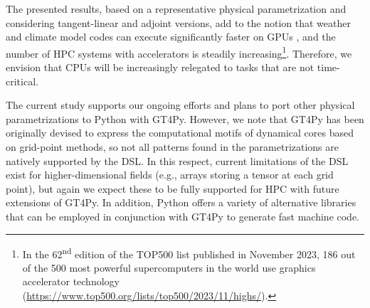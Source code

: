 \documentclass[gmd,manuscript,online]{copernicus}
\theoremstyle{theorem}
\theoremstyle{definition}
\theoremstyle{remark}
\theoremstyle{proposition}
\begin{document}
	The presented results, based on a representative physical parametrization and considering tangent-linear and adjoint versions, add to the notion that weather and climate model codes can execute significantly faster on GPUs \citep{fuhrer18}, and the number of HPC systems with accelerators is steadily increasing\footnote{In the 62\textsuperscript{nd} edition of the TOP500 list published in November 2023, 186 out of the 500 most powerful supercomputers in the world use graphics accelerator technology (\url{https://www.top500.org/lists/top500/2023/11/highs/}).}. Therefore, we envision that CPUs will be increasingly relegated to tasks that are not time-critical.


	The current study supports our ongoing efforts and plans to port other physical parametrizations to Python with GT4Py. However, we note that GT4Py has been originally devised to express the computational motifs of dynamical cores based on grid-point methods, so not all patterns found in the parametrizations are natively supported by the DSL. In this respect, current limitations of the DSL exist for higher-dimensional fields (e.g., arrays storing a tensor at each grid point), but again we expect these to be fully supported for HPC with future extensions of GT4Py. In addition, Python offers a variety of alternative libraries that can be employed in conjunction with GT4Py to generate fast machine code.

	\appendix
\end{document}
